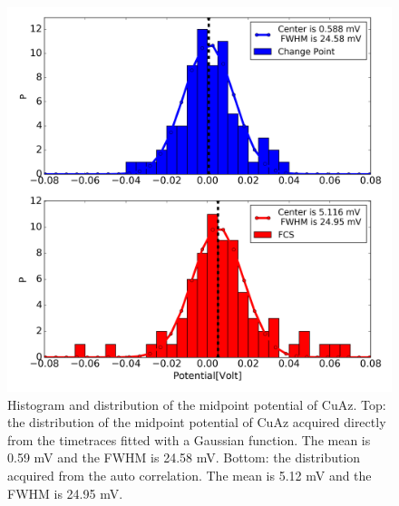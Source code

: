 \documentclass[twoside,single]{lion-msc}
\begin{document}
\begin{figure}[ht!]
\centering
\includegraphics[width=\textwidth]{midpointhistograms}
\caption{Histogram and distribution of the midpoint potential of CuAz. Top: the distribution of the midpoint potential of CuAz acquired directly from the timetraces fitted with a Gaussian function. The mean is 0.59 mV and the FWHM is 24.58 mV. Bottom: the distribution acquired from the auto correlation. The mean is 5.12 mV and the FWHM is 24.95 mV.}
\label{t_ratio_plot}
\end{figure}



\end{document}
